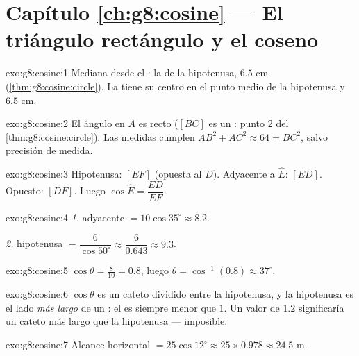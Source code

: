 \section*{Capítulo \ref{ch:g8:cosine} --- El triángulo rectángulo y el coseno}

\begin{solution}{exo:g8:cosine:1}
Mediana desde el : la  de la hipotenusa, $6.5$ cm
(\cref{thm:g8:cosine:circle}). La  tiene su centro
en el punto medio de la hipotenusa y  $6.5$ cm.
\end{solution}

\begin{solution}{exo:g8:cosine:2}
El ángulo en $A$ es recto ($[BC]$ es un : punto 2 del
\cref{thm:g8:cosine:circle}). Las medidas cumplen
$AB^2 + AC^2 \approx 64 = BC^2$, salvo precisión de medida.
\end{solution}

\begin{solution}{exo:g8:cosine:3}
Hipotenusa: $[EF]$ (opuesta al  $D$). Adyacente a
$\widehat E$: $[ED]$. Opuesto: $[DF]$. Luego
$\cos\widehat E = \dfrac{ED}{EF}$.
\end{solution}

\begin{solution}{exo:g8:cosine:4}
\emph{1.} adyacente $= 10 \cos 35^\circ \approx 8.2$.

\emph{2.} hipotenusa $= \dfrac{6}{\cos 50^\circ} \approx
\dfrac{6}{0.643} \approx 9.3$.
\end{solution}

\begin{solution}{exo:g8:cosine:5}
$\cos\theta = \frac{8}{10} = 0.8$, luego
$\theta = \cos^{-1}(0.8) \approx 37^\circ$.
\end{solution}

\begin{solution}{exo:g8:cosine:6}
$\cos\theta$ es un cateto dividido entre la hipotenusa, y la hipotenusa
es el lado \emph{más largo} de un : el  es
siempre menor que $1$. Un valor de $1.2$ significaría un cateto más largo
que la hipotenusa --- imposible.
\end{solution}

\begin{solution}{exo:g8:cosine:7}
Alcance horizontal $= 25 \cos 12^\circ \approx 25 \times 0.978 \approx
24.5$ m.
\end{solution}

